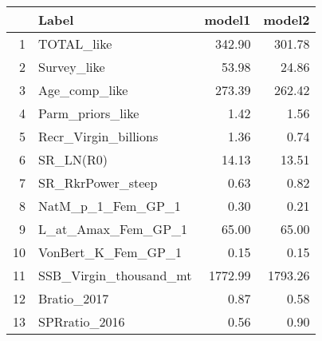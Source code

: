 \begin{table}[ht]
\centering
\begin{tabular}{rlrr}
  \hline
 & Label & model1 & model2 \\ 
  \hline
1 & TOTAL\_like & 342.90 & 301.78 \\ 
  2 & Survey\_like & 53.98 & 24.86 \\ 
  3 & Age\_comp\_like & 273.39 & 262.42 \\ 
  4 & Parm\_priors\_like & 1.42 & 1.56 \\ 
  5 & Recr\_Virgin\_billions & 1.36 & 0.74 \\ 
  6 & SR\_LN(R0) & 14.13 & 13.51 \\ 
  7 & SR\_RkrPower\_steep & 0.63 & 0.82 \\ 
  8 & NatM\_p\_1\_Fem\_GP\_1 & 0.30 & 0.21 \\ 
  9 & L\_at\_Amax\_Fem\_GP\_1 & 65.00 & 65.00 \\ 
  10 & VonBert\_K\_Fem\_GP\_1 & 0.15 & 0.15 \\ 
  11 & SSB\_Virgin\_thousand\_mt & 1772.99 & 1793.26 \\ 
  12 & Bratio\_2017 & 0.87 & 0.58 \\ 
  13 & SPRratio\_2016 & 0.56 & 0.90 \\ 
   \hline
\end{tabular}
\end{table}
